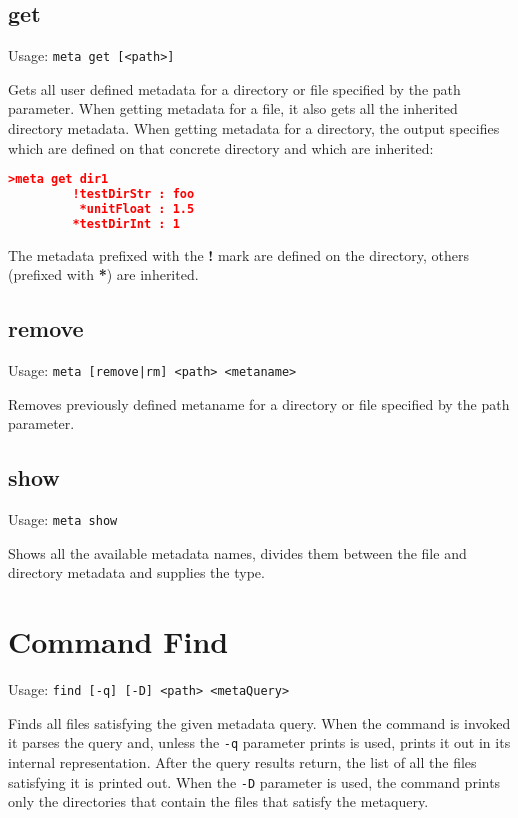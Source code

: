 \subsection{get}

Usage: \texttt{meta get [<path>]}

Gets all user defined metadata for a directory or file specified by
the path parameter. When getting metadata for a file, it also gets
all the inherited directory metadata. When getting metadata for a
directory, the output specifies which are defined on that concrete
directory and which are inherited:
\begin{lstlisting}[language=json]
>meta get dir1
         !testDirStr : foo
          *unitFloat : 1.5
         *testDirInt : 1
\end{lstlisting}
The metadata prefixed with the \textbf{!} mark are defined on the
directory, others (prefixed with \textbf{*}) are inherited.

\subsection{remove}

Usage: \texttt{meta [remove|rm] <path> <metaname>}

Removes previously defined metaname for a directory or file
specified by the path parameter.

\subsection{show}

Usage: \texttt{meta show}

Shows all the available metadata names, divides them between the
file and directory metadata and supplies the type.

\section{Command Find}

Usage: \texttt{find [-q] [-D] <path> <metaQuery>}

Finds all files satisfying the given metadata query. When the
command is invoked it parses the query and, unless the \texttt{-q}
parameter prints is used, prints it out in its internal
representation. After the query results return, the list of all
the files satisfying it is printed out. When the \texttt{-D}
parameter is used, the command prints only the directories
that contain the files that satisfy the metaquery.

